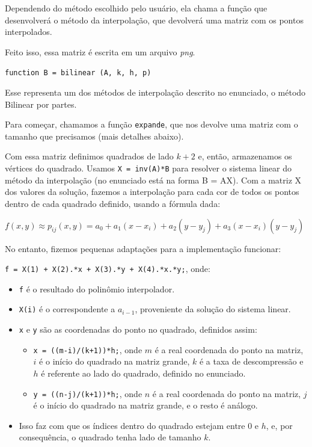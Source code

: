 \documentclass[12pt,letterpaper]{article}
\begin{document}
	Dependendo do método escolhido pelo usuário, ela chama a função que desenvolverá o método da interpolação, que devolverá uma matriz com os pontos interpolados.
	
	Feito isso, essa matriz é escrita em um arquivo \textit{png}.

	\begin{center}
		\texttt{function B = bilinear (A, k, h, p)}
	\end{center}
	
	Esse representa um dos métodos de interpolação descrito no enunciado, o método Bilinear por partes.
	
	Para começar, chamamos a função \texttt{expande}, que nos devolve uma matriz com o tamanho que precisamos (mais detalhes abaixo).
	
	Com essa matriz definimos quadrados de lado $k+2$ e, então, armazenamos os vértices do quadrado. Usamos \texttt{X = inv(A)*B} para resolver o sistema linear do método da interpolação (no enunciado está na forma B = AX). Com a matriz X dos valores da solução, fazemos a interpolação para cada cor de todos os pontos dentro de cada quadrado definido, usando a fórmula dada:
	
	\begin{center}
		$f(x, y) \approx p_{ij} (x, y) = a_0 + a_1(x - x_i ) + a_2 (y - y_j ) + a_3 (x - x_i )(y - y_j)$
	\end{center}
	
	No entanto, fizemos pequenas adaptações para a implementação funcionar:
	
	\begin{center}
		\texttt{f = X(1) + X(2).*x + X(3).*y + X(4).*x.*y;}, onde:
	\end{center}
	
	\begin{itemize}
		\item \texttt{f} é o resultado do polinômio interpolador.
		\item \texttt{X(i)} é o correspondente a $a_{i-1}$, proveniente da solução do sistema linear.
		\item \texttt{x} e \texttt{y} são as coordenadas do ponto no quadrado, definidos assim:
		\begin{itemize}
			\item \texttt{x = ((m-i)/(k+1))*h;}, onde $m$ é a real coordenada do ponto na matriz, $i$ é o início do quadrado na matriz grande, $k$ é a taxa de descompressão e $h$ é referente ao lado do quadrado, definido no enunciado.
			\item \texttt{y = ((n-j)/(k+1))*h;}, onde $n$ é a real coordenada do ponto na matriz, $j$ é o início do quadrado na matriz grande, e o resto é análogo.
		\end{itemize}
		\item Isso faz com que os índices dentro do quadrado estejam entre 0 e $h$, e, por consequência, o quadrado tenha lado de tamanho $k$.
	\end{itemize}
	
\end{document}
